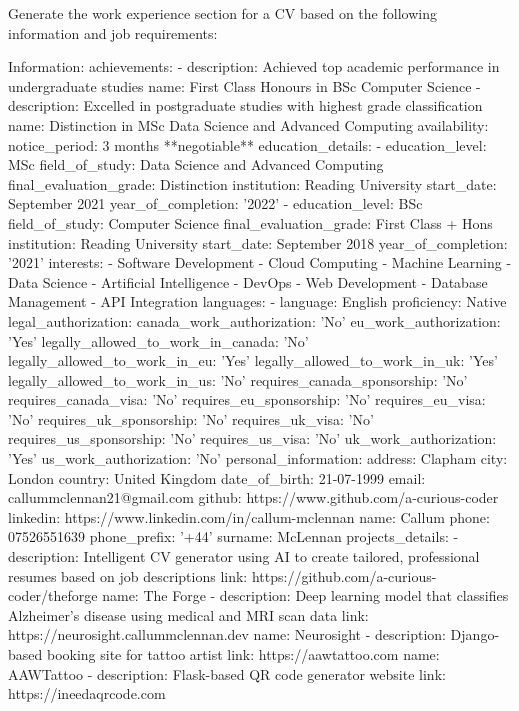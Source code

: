 \documentclass{resume}
\begin{document}
    Generate the work experience section for a CV based on the following information and job requirements:

    Information:
    achievements:
- description: Achieved top academic performance in undergraduate studies
  name: First Class Honours in BSc Computer Science
- description: Excelled in postgraduate studies with highest grade classification
  name: Distinction in MSc Data Science and Advanced Computing
availability:
  notice_period: 3 months **negotiable**
education_details:
- education_level: MSc
  field_of_study: Data Science and Advanced Computing
  final_evaluation_grade: Distinction
  institution: Reading University
  start_date: September 2021
  year_of_completion: '2022'
- education_level: BSc
  field_of_study: Computer Science
  final_evaluation_grade: First Class + Hons
  institution: Reading University
  start_date: September 2018
  year_of_completion: '2021'
interests:
- Software Development
- Cloud Computing
- Machine Learning
- Data Science
- Artificial Intelligence
- DevOps
- Web Development
- Database Management
- API Integration
languages:
- language: English
  proficiency: Native
legal_authorization:
  canada_work_authorization: 'No'
  eu_work_authorization: 'Yes'
  legally_allowed_to_work_in_canada: 'No'
  legally_allowed_to_work_in_eu: 'Yes'
  legally_allowed_to_work_in_uk: 'Yes'
  legally_allowed_to_work_in_us: 'No'
  requires_canada_sponsorship: 'No'
  requires_canada_visa: 'No'
  requires_eu_sponsorship: 'No'
  requires_eu_visa: 'No'
  requires_uk_sponsorship: 'No'
  requires_uk_visa: 'No'
  requires_us_sponsorship: 'No'
  requires_us_visa: 'No'
  uk_work_authorization: 'Yes'
  us_work_authorization: 'No'
personal_information:
  address: Clapham
  city: London
  country: United Kingdom
  date_of_birth: 21-07-1999
  email: callummclennan21@gmail.com
  github: https://www.github.com/a-curious-coder
  linkedin: https://www.linkedin.com/in/callum-mclennan
  name: Callum
  phone: 07526551639
  phone_prefix: '+44'
  surname: McLennan
projects_details:
- description: Intelligent CV generator using AI to create tailored, professional
    resumes based on job descriptions
  link: https://github.com/a-curious-coder/theforge
  name: The Forge
- description: Deep learning model that classifies Alzheimer's disease using medical
    and MRI scan data
  link: https://neurosight.callummclennan.dev
  name: Neurosight
- description: Django-based booking site for tattoo artist
  link: https://aawtattoo.com
  name: AAWTattoo
- description: Flask-based QR code generator website
  link: https://ineedaqrcode.com
\end{document}
